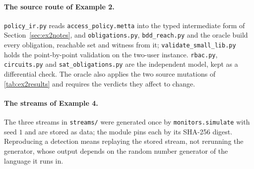 \documentclass[11pt]{article}
\newcommand{\fpath}[1]{\nolinkurl{#1}}
\theoremstyle{definition}
\theoremstyle{plain}
\begin{document}
\paragraph{The source route of Example 2.} \fpath{policy_ir.py} reads \fpath{access_policy.metta} into
the typed intermediate form of Section~\ref{sec:ex2notes}, and \fpath{obligations.py},
\fpath{bdd_reach.py} and the oracle build every obligation, reachable set and witness from it;
\fpath{validate_small_lib.py} holds the point-by-point validation on the two-user instance.
\fpath{rbac.py}, \fpath{circuits.py} and \fpath{sat_obligations.py} are the independent model, kept as
a differential check. The oracle also applies the two source mutations of \cref{tab:ex2results} and
requires the verdicts they affect to change.

\paragraph{The streams of Example 4.} The three streams in \fpath{streams/} were generated once by
\fpath{monitors.simulate} with seed $1$ and are stored as data; the module pins each by its SHA-256
digest. Reproducing a detection means replaying the stored stream, not rerunning the generator, whose
output depends on the random number generator of the language it runs in.
\end{document}
